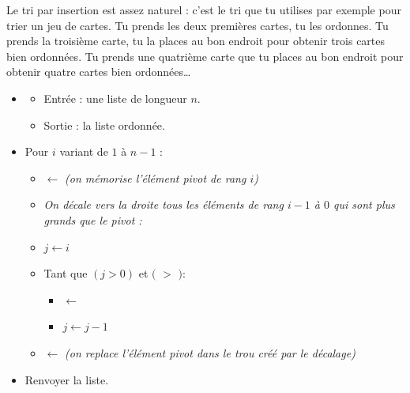 \documentclass[11pt,class=report,crop=false]{standalone}
\begin{document}
\begin{activite}


Le tri par insertion est assez naturel : c'est le tri que tu utilises par exemple pour trier un jeu de cartes. 
Tu prends les deux premières cartes, tu les ordonnes. Tu prends la troisième carte, tu la places au bon endroit pour obtenir trois cartes bien ordonnées. Tu prends une quatrième carte que tu places au bon endroit pour obtenir quatre cartes bien ordonnées\ldots

	\begin{algorithme}
	\sauteligne 	
	\begin{itemize}
		\item 
		\begin{itemize}
			\item Entrée : une liste de longueur $n$.				
			\item Sortie : la liste ordonnée.				
		\end{itemize}
		
		\item Pour $i$ variant de $1$ à $n-1$ :
		\begin{itemize} 
			\item {} $\leftarrow$  \quad  \emph{(on mémorise l'élément pivot de rang $i$)}
			\item \emph{On décale vers la droite tous les éléments de rang $i-1$ à $0$ qui sont plus grands que le pivot :}  
			\item $j \leftarrow i$
			\item Tant que $(j>0)$ et $($ $>$ $)$:
			\begin{itemize}
				\item {} $\leftarrow$ 
				\item $j \leftarrow j-1$
			\end{itemize}
			\item {} $\leftarrow$  \quad  \emph{(on replace l'élément pivot dans le trou créé par le décalage)}
		\end{itemize}			
		
		\item Renvoyer la liste.			
	\end{itemize}
\end{algorithme} 

	\bigskip


\end{activite}
\end{document}
